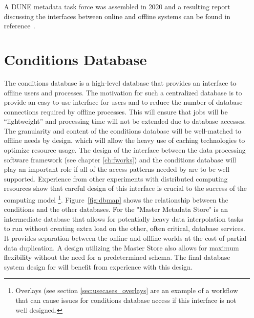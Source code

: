 \documentclass[../main-v1.tex]{subfiles}
\begin{document}
A DUNE metadata task force was assembled in 2020 and a resulting report discussing the interfaces between online and offline systems can be found in reference~\cite{bib:docdb22983}.

\section{Conditions Database  }
\label{sec:db:conditions} 

The conditions database is a high-level database that provides an interface to offline users and processes. The motivation for such a centralized database is to provide an easy-to-use interface for users and to reduce the number of database connections required by offline processes. This will ensure that jobs will be ``lightweight'' and processing time will not be extended due to database accesses.  The granularity and content of the conditions database will be well-matched to offline needs by design. which will allow the heavy use of caching technologies to optimize resource usage. The design of the interface between the data processing software framework (see chapter \ref{ch:fworks}) and the conditions database will play an important role if all of the access patterns needed by  are to be well supported. Experience from other  experiments with distributed computing resources show that careful design of this interface is crucial to the success of the computing model \footnote{Overlays (see section \ref{sec:usecases_overlays} are an example of a workflow that can cause issues for conditions database access if this interface is not well designed.}.
Figure~\ref{fig:dbmap} shows the relationship between the conditions  and the other  databases. For  the "Master Metadata Store" is an intermediate database that allows for potentially heavy data interpolation tasks to run without creating extra load on the other, often critical, database services.  It provides separation between the online and offline worlds at the cost of partial data duplication. A design utilizing the Master Store also allows for maximum flexibility without the need for a predetermined schema. The final database system design for  will benefit from experience with this design.
\end{document}
